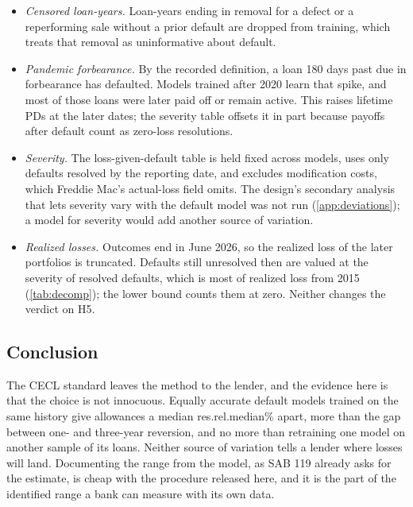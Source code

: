 \begin{itemize}[leftmargin=*, itemsep=2pt]
severity table of loans repurchased for a defect found after $T$. None of
these is a default outcome after $T$, but (a), (b) and (d) are information a
lender at $T$ did not have in this form.
\item \emph{Censored loan-years.} Loan-years ending in removal for a defect or
a reperforming sale without a prior default are dropped from training, which
treats that removal as uninformative about default.
\item \emph{Pandemic forbearance.} By the recorded definition, a loan 180 days
past due in forbearance has defaulted. Models trained after 2020 learn that
spike, and most of those loans were later paid off or remain active. This
raises lifetime PDs at the later dates; the severity table offsets it in part
because payoffs after default count as zero-loss resolutions.
\item \emph{Severity.} The loss-given-default table is held fixed across
models, uses only defaults resolved by the reporting date, and excludes
modification costs, which Freddie Mac's actual-loss field omits. The design's
secondary analysis that lets severity vary with the default model was not run
(\cref{app:deviations}); a model for severity would add another source of
variation.
\item \emph{Realized losses.} Outcomes end in June 2026, so the realized loss
of the later portfolios is truncated. Defaults still unresolved then are
valued at the severity of resolved defaults, which is most of realized loss
from 2015 (\cref{tab:decomp}); the lower bound counts them at zero. Neither
changes the verdict on H5.
\end{itemize}

\subsection{Conclusion}

The CECL standard leaves the method to the lender, and the evidence here is
that the choice is not innocuous. Equally accurate default models trained on
the same history give allowances a median \num{res.rel.median}\% apart, more
than the gap between one- and three-year reversion, and no more than
retraining one model on another sample of its loans. Neither source of
variation tells a lender where losses will land. Documenting the range from
the model, as SAB 119 already asks for the estimate, is cheap with the
procedure released here, and it is the part of the identified range a bank
can measure with its own data.
